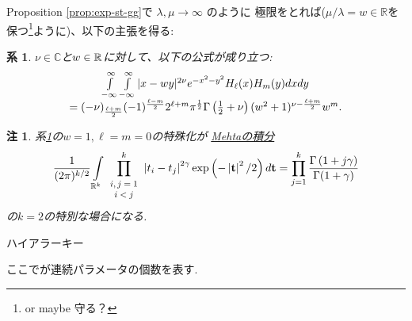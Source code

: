 \documentclass[pdf,notes]{beamer}
\newtheorem{remark}{注}
\newtheorem{cor}{系}
\begin{document}
\begin{frame}
	Proposition \ref{prop:exp-st-gg}で $\lambda,\mu\to\infty$ のように
	極限をとれば($\mu/\lambda=w\in\mathbb{R}$を保つ\footnote{or maybe 守る？}ように)、以下の主張を得る:
	\begin{cor}\label{cor:int-xzy-hh}
		$\nu\in\mathbb{C}$と$w\in\R$に対して、以下の公式が成り立つ:
		\begin{equation*}
			\begin{array}[]{c}
			\int_{- \infty}^{\infty} \int_{- \infty}^{\infty} | x - w y |^{2 \nu} e^{-
			x^2 - y^2} H_\ell (x) H_m (y) d x d y \\= (- \nu)_{\frac{\ell + m}{2}} (- 1)^{\frac{\ell
			- m}{2}} 2^{\ell + m} \pi^{\frac{1}{2}} \Gamma \left( \frac{1}{2} + \nu \right)
			(w^2 + 1)^{\nu - \frac{\ell + m}{2}} w^m .
			\end{array}
		\end{equation*}
	\end{cor}
	\pause
	\vspace{-0.2cm}
	\begin{remark}
		系\ref{cor:int-xzy-hh}の$w=1,\ell=m=0$の特殊化が
		\underline{Mehtaの積分}
	\vspace{-0.3cm}
		\begin{equation*}
			\frac{1}{(2\pi)^{k/2}}\int_{\mathbb{R}^k}\prod_{\scalebox{0.8}{$\begin{array}[]{c}
			i,j=1\\i<j
		\end{array}$}}^{k}\myabs{t_i-t_j}^{2\gamma}\exp\left( -\myabs{\mathbf{t}}^2/2 \right)d\mathbf{t}=\prod_{j=1}^k\frac{\Gamma\left( 
			1+j\gamma\right)}{\Gamma(1+\gamma)}
	\vspace{-0.4cm}
		\end{equation*}
		の$k=2$の特別な場合になる.
	\end{remark}
\end{frame}
\begin{frame}[fragile]{ハイアラーキー}
\begin{tikzpicture}

\end{tikzpicture}
ここで{\color{blue}{青い数字}}が連続パラメータの個数を表す.
\end{frame}
\end{document}
